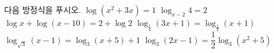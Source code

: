 다음 방정식을 푸시오.
 $\log (x^2+3x)=1$
 $\log_{x-2} 4=2$
 $\log x+\log (x-10)=2+\log 2$
 $\log_{\frac{1}{4}} (3x+1)=\log_{\frac{1}{2}} (x+1)$
 $\log_{\sqrt{3}} (x-1)=\log_3 (x+5)+1$
 $\log_3 (2x-1)=\dfrac{1}{2}\log_3 (x^2+5)$
